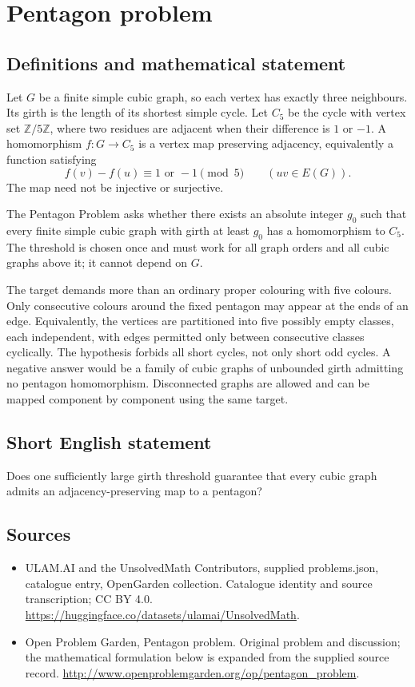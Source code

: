\documentclass[11pt,a4paper]{article}
\begin{document}
\section*{Pentagon problem}\label{statement}

\subsection{Definitions and mathematical statement}
Let $G$ be a finite simple cubic graph, so each
vertex has exactly three neighbours. Its girth
is the length of its shortest simple cycle.
Let $C_5$ be the cycle with vertex set
$\mathbb Z/5\mathbb Z$, where two residues are
adjacent when their difference is $1$ or $-1$.
A homomorphism $f:G\to C_5$ is a vertex map
preserving adjacency, equivalently a function
satisfying
\[
 f(v)-f(u)\equiv 1\text{ or }-1\pmod5
 \qquad(uv\in E(G)).
\]
The map need not be injective or surjective.

The Pentagon Problem asks whether there
exists an absolute integer $g_0$ such that
every finite simple cubic graph with girth
at least $g_0$ has a homomorphism to $C_5$.
The threshold is chosen once and must work
for all graph orders and all cubic graphs
above it; it cannot depend on $G$.

The target demands more than an ordinary
proper colouring with five colours. Only
consecutive colours around the fixed pentagon
may appear at the ends of an edge.
Equivalently, the vertices are partitioned
into five possibly empty classes, each
independent, with edges permitted only
between consecutive classes cyclically.
The hypothesis forbids all short cycles,
not only short odd cycles. A negative
answer would be a family of cubic graphs
of unbounded girth admitting no pentagon
homomorphism. Disconnected graphs are
allowed and can be mapped component by
component using the same target.
\subsection{Short English statement}
Does one sufficiently large girth threshold guarantee that every cubic graph admits an adjacency-preserving map to a pentagon?
\subsection{Sources}
\begin{itemize}
\item[S1] ULAM.AI and the UnsolvedMath Contributors, supplied problems.json, catalogue entry, OpenGarden collection. Catalogue identity and source transcription; CC BY 4.0.
\url{https://huggingface.co/datasets/ulamai/UnsolvedMath}.
\item[S2] Open Problem Garden, Pentagon problem. Original problem and discussion; the mathematical formulation below is expanded from the supplied source record.
\url{http://www.openproblemgarden.org/op/pentagon_problem}.
\end{itemize}
\end{document}

